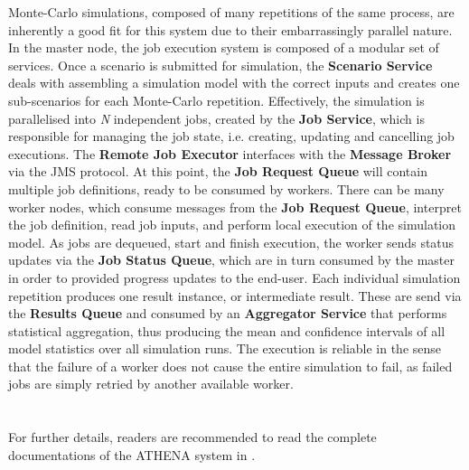 Monte-Carlo simulations, composed of many repetitions of the same process, are inherently a good fit for this system due to their embarrassingly parallel nature. 
In the master node, the job execution system is composed of a modular set of services. Once a scenario is submitted for simulation, the \textbf{Scenario Service} deals with assembling a simulation model with the correct inputs and creates one sub-scenarios for each Monte-Carlo repetition. Effectively, the simulation is parallelised into \textit{N} independent jobs, created by the \textbf{Job Service}, which is responsible for managing the job state, i.e. creating, updating and cancelling job executions. The \textbf{Remote Job Executor} interfaces with the \textbf{Message Broker} via the JMS protocol. At this point, the \textbf{Job Request Queue} will contain multiple job definitions, ready to be consumed by workers. 
There can be many worker nodes, which consume messages from the \textbf{Job Request Queue}, interpret the job definition, read job inputs, and perform local execution of the simulation model. As jobs are dequeued, start and finish execution, the worker sends status updates via the \textbf{Job Status Queue}, which are in turn consumed by the master in order to provided progress updates to the end-user. Each individual simulation repetition produces one result instance, or intermediate result. These are send via the \textbf{Results Queue} and consumed by an \textbf{Aggregator Service} that performs statistical aggregation, thus producing the mean and confidence intervals of all model statistics over all simulation runs. The execution is reliable in the sense that the failure of a worker does not cause the entire simulation to fail, as failed jobs are simply retried by another available worker. 
\\
\\
\\
For further details, readers are recommended to read the complete documentations of the ATHENA system in \parencite{athenaAllDoc}.
